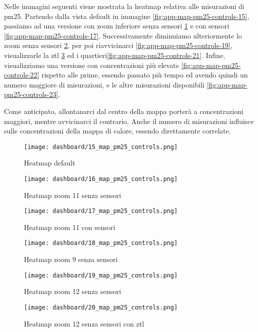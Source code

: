 Nelle immagini seguenti viene mostrata la heatmap relativa alle misurazioni di \acrshort{pm25}.
Partendo dalla vista default in immagine \ref{fig:app-map-pm25-controls-15},
passiamo ad una versione con zoom inferiore senza sensori \ref{fig:app-map-pm25-controls-16} e
con sensori \ref{fig:app-map-pm25-controls-17}.
Successivamente diminuiamo ulteriormente lo zoom senza sensori \ref{fig:app-map-pm25-controls-18}, per poi
riavvicinarci \ref{fig:app-map-pm25-controls-19}, visualizzarle la \acrshort{ztl} \ref{fig:app-map-pm25-controls-20} ed i
quartieri\ref{fig:app-map-pm25-controls-21}.
Infine, visualizziamo una versione con concentrazioni più elevate \ref{fig:app-map-pm25-controls-22}
rispetto alle prime, essendo passato più tempo ed avendo quindi un numero maggiore di misurazioni, e le altre
misurazioni disponibili \ref{fig:app-map-pm25-controls-23}.

Come anticipato, allontanarci dal centro della mappa porterà a concentrazioni maggiori, mentre avvicinarci il contrario.
Anche il numero di misurazioni influisce sulle concentrazioni della mappa di calore, essendo direttamente correlate.

\begin{figure}[H]
  \centering
  \texttt{[image: dashboard/15\_map\_pm25\_controls.png]}
  \caption{Heatmap default}
  \label{fig:app-map-pm25-controls-15}

  \hfill

  \texttt{[image: dashboard/16\_map\_pm25\_controls.png]}
  \caption{Heatmap zoom 11 senza sensori}
  \label{fig:app-map-pm25-controls-16}
\end{figure}

\begin{figure}[H]
  \centering
  \texttt{[image: dashboard/17\_map\_pm25\_controls.png]}
  \caption{Heatmap zoom 11 con sensori}
  \label{fig:app-map-pm25-controls-17}

  \hfill

  \texttt{[image: dashboard/18\_map\_pm25\_controls.png]}
  \caption{Heatmap zoom 9 senza sensori}
  \label{fig:app-map-pm25-controls-18}
\end{figure}

\begin{figure}[H]
  \centering
  \texttt{[image: dashboard/19\_map\_pm25\_controls.png]}
  \caption{Heatmap zoom 12 senza sensori}
  \label{fig:app-map-pm25-controls-19}

  \hfill

  \texttt{[image: dashboard/20\_map\_pm25\_controls.png]}
  \caption{Heatmap zoom 12 senza sensori con \acrshort{ztl}}
  \label{fig:app-map-pm25-controls-20}
\end{figure}

